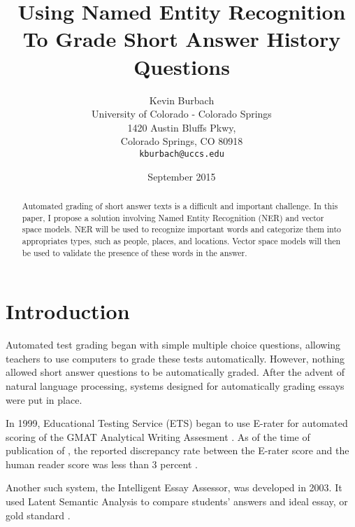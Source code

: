 \documentclass{sig-alternate}
\begin{document}
\title{Using Named Entity Recognition To Grade Short Answer History Questions}
\author{Kevin Burbach\\
        University of Colorado - Colorado Springs\\
        1420 Austin Bluffs Pkwy,\\
        Colorado Springs, CO 80918\\
        \texttt{kburbach@uccs.edu}
       }
\date{September 2015}

\maketitle

\begin{abstract}
   Automated grading of short answer texts is a difficult and important challenge. In this paper, I propose a solution involving Named Entity Recognition (NER) and vector space models. NER will be used to recognize important words and categorize them into appropriates types, such as people, places, and locations. Vector space models will then be used to validate the presence of these words in the answer.
\end{abstract}

\section{Introduction}
Automated test grading began with simple multiple choice questions, allowing teachers to use computers to grade these tests automatically. However, nothing allowed short answer questions to be automatically graded. After the advent of natural language processing, systems designed for automatically grading essays were put in place.

In 1999, Educational Testing Service (ETS) began to use E-rater for automated scoring of the GMAT Analytical Writing Assesment \cite{burstein_pdf}. As of the time of publication of \cite{burstein_pdf}, the reported discrepancy rate between the E-rater score and the human reader score was less than 3 percent \cite{burstein_pdf}. 

Another such system, the Intelligent Essay Assessor, was developed in 2003. It used Latent Semantic Analysis to compare students' answers and ideal essay, or gold standard \cite{auto_marking}.





{}

\end{document}
